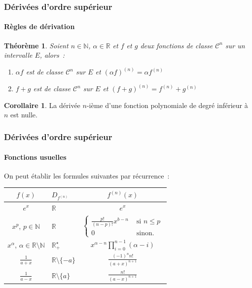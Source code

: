 \documentclass[10pt,notheorems]{beamer}
\theoremstyle{plain}
\newtheorem{theorem}{Théorème}
\theoremstyle{definition} %
\newtheorem{corollary}{Corollaire}%
\begin{document}
\begin{frame}
  \frametitle{Dérivées d'ordre supérieur}
  \framesubtitle{Règles de dérivation}
  \hypertarget{slide_derivees_ordre_n_2}{}

  \begin{theorem}
    Soient $n\in\mathbb N$, $\alpha\in \mathbb R$ et $f$ et $g$ deux fonctions de classe $\mathcal C^n$ sur un intervalle $E$, alors~:\newline
    \begin{enumerate}
    \item $\alpha f$ est de classe $\mathcal C^n$ sur $E$ et $\left(\alpha f\right)^{(n)} = \alpha f^{(n)}$\newline
    \item $f+g$  est de classe $\mathcal C^n$ sur $E$ et $\left(f+g\right)^{(n)} = f^{(n)} + g^{(n)}$
    \end{enumerate}
  \end{theorem}

  \bigskip

  \begin{corollary}
    La dérivée $n$-ième d'une fonction polynomiale de degré inférieur à $n$ est nulle.
  \end{corollary}

\end{frame}


\begin{frame}
  \frametitle{Dérivées d'ordre supérieur}
  \framesubtitle{Fonctions usuelles}
  \hypertarget{slide_derivees_ordre_n_3}{}

  \bigskip

  On peut établir les formules suivantes par récurrence~:

  \bigskip

  \renewcommand{\arraystretch}{2}
  \begin{table}[H]
    \centering
    {\small
      \begin{tabular}{c|l|c}
        \hline
        $f(x)$ & $D_{f^{(n)}}$ & $f^{(n)}(x)$\\ \hline
        $e^x$  & $\mathbb R$ & $e^x$\\
        \multirow{2}{*}{$x^p$, $p\in\mathbb N$}  & \multirow{2}{*}{$\mathbb R$} & \multirow{2}{*}{$\begin{cases}\frac{p!}{(n-p)!}x^{b-n} & \text{ si }n\leq p\\ 0 & \text{ sinon.}\end{cases}$}\\
               & & \\
        $x^{\alpha}$, $\alpha\in\mathbb R\setminus\mathbb N$ & $\mathbb R_+^{\star}$ & $x^{\alpha-n}\prod_{i=0}^{n-1}(\alpha-i)$ \\
        $\frac{1}{a+x}$ & $\mathbb R \setminus \{-a\}$ & $\frac{(-1)^nn!}{(a+x)^{n+1}}$ \\
        $\frac{1}{a-x}$ & $\mathbb R \setminus \{a\}$ & $\frac{n!}{(a-x)^{n+1}}$ \\ \hline\hline
      \end{tabular}}
  \end{table}

\end{frame}
\end{document}
